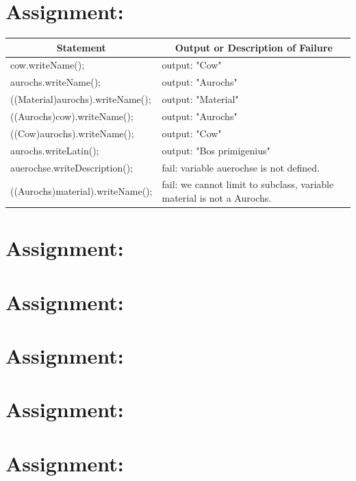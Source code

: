 \documentclass[a4paper,12pt,oneside]{scrreprt}
\begin{document}
	\setcounter{chapter}{2} %
	\section{Assignment:}
	
    
	\begin{table}[h]
		\centering
		\resizebox{\textwidth}{!}
		{%
			\begin{tabular}{|l|l|}
				\hline
				\multicolumn{1}{|c|}{\textbf{Statement}} & \multicolumn{1}{c|}{\textbf{Output or Description of Failure}} \\ \hline
				cow.writeName();                         & output: "Cow"         \\ \hline
				aurochs.writeName();                     & output: "Aurochs"     \\ \hline
				((Material)aurochs).writeName();         & output: "Material"    \\ \hline
				((Aurochs)cow).writeName();              & output: "Aurochs"     \\ \hline
				((Cow)aurochs).writeName();              & output: 
                "Cow"         \\ \hline
				aurochs.writeLatin();                    & output: "Bos primigenius"  \\ \hline
				auerochse.writeDescription();              & fail:
                variable auerochse is not defined.      \\ \hline
				((Aurochs)material).writeName();         & fail: we cannot limit to subclass, variable material is not a Aurochs.
				                                                                 \\ \hline
			\end{tabular}
		}
	\end{table}
	
	\section{Assignment:}
	\section{Assignment:}
	\section{Assignment:}
	\section{Assignment:}
	\section{Assignment:}
\end{document}
